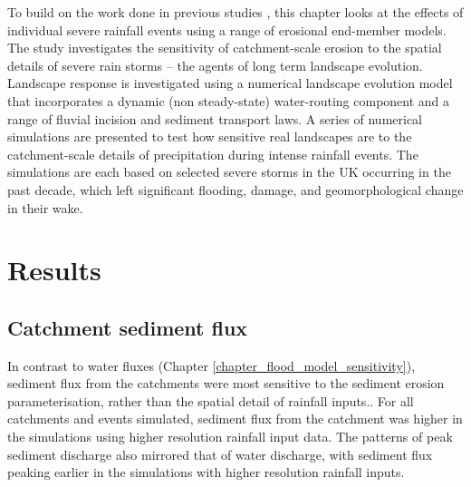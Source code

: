 To build on the work done in previous studies \citep[e.g.][]{coulthard2016sensitivity}, this chapter looks at the effects of individual severe rainfall events using a range of erosional end-member models. The study investigates the sensitivity of catchment-scale erosion to the spatial details of severe rain storms -- the agents of long term landscape evolution. Landscape response is investigated using a numerical landscape evolution model that incorporates a dynamic (non steady-state) water-routing component and a range of fluvial incision and sediment transport laws. A series of numerical simulations are presented to test how sensitive real landscapes are to the catchment-scale details of precipitation during intense rainfall events. The simulations are each based on selected severe storms in the UK occurring in the past decade, which left significant flooding, damage, and geomorphological change in their wake.

%
%

\section{Results}
\subsection{Catchment sediment flux}
In contrast to water fluxes (Chapter \ref{chapter_flood_model_sensitivity}), sediment flux from the catchments were most sensitive to the sediment erosion parameterisation, rather than the spatial detail of rainfall inputs.. For all catchments and events simulated, sediment flux from the catchment was higher in the simulations using higher resolution rainfall input data. The patterns of peak sediment discharge also mirrored that of water discharge, with sediment flux peaking earlier in the simulations with higher resolution rainfall inputs. 

